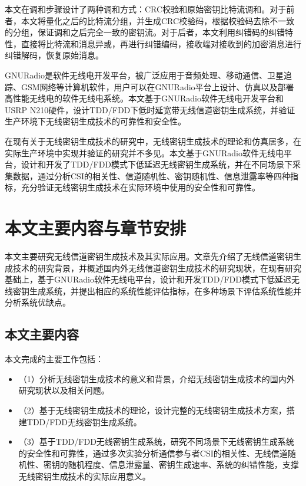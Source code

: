 \documentclass[master]{seuthesis} %
\begin{document}
\begin{Main}
本文在调和步骤设计了两种调和方式：CRC校验和原始密钥比特流调和。对于前者，本文将量化之后的比特流分组，并生成CRC校验码，根据校验码去除不一致的分组，保证调和之后完全一致的密钥流。对于后者，本文利用纠错码的纠错特性，直接将比特流和消息异或，再进行纠错编码，接收端对接收到的加密消息进行纠错解码，恢复原始消息。

GNURadio是软件无线电开发平台，被广泛应用于音频处理、移动通信、卫星追踪、GSM网络等计算机软件\cite{Blossom2004GNU}，用户可以在GNURadio平台上设计、仿真以及部署高性能无线电的软件无线电系统。本文基于GNURadio软件无线电开发平台和USRP N210硬件，设计TDD/FDD下低时延宽带无线信道密钥生成系统，并验证生产环境下无线密钥生成技术的可靠性和安全性。

在现有关于无线密钥生成技术的研究中，无线密钥生成技术的理论和仿真居多，在实际生产环境中实现并验证的研究并不多见。本文基于GNURadio软件无线电平台，设计和开发了TDD/FDD模式下低延迟无线密钥生成系统，并在不同场景下采集数据，通过分析CSI的相关性、信道随机性、密钥随机性、信息泄露率等四种指标，充分验证无线密钥生成技术在实际环境中使用的安全性和可靠性。

\section{本文主要内容与章节安排}

本文主要研究无线信道密钥生成技术及其实际应用。文章先介绍了无线信道密钥生成技术的研究背景，并概述国内外无线信道密钥生成技术的研究现状，在现有研究基础上，基于GNURadio软件无线电平台，设计和开发TDD/FDD模式下低延迟无线密钥生成系统，并提出相应的系统性能评估指标，在多种场景下评估系统性能并分析系统优缺点。

\subsection{本文主要内容}

本文完成的主要工作包括：

\begin{itemize}
    \item（1）分析无线密钥生成技术的意义和背景，介绍无线密钥生成技术的国内外研究现状以及相关问题。
    \item（2）基于无线密钥生成技术的理论，设计完整的无线密钥生成技术方案，搭建TDD/FDD无线密钥生成系统。
    \item（3）基于TDD/FDD无线密钥生成系统，研究不同场景下无线密钥生成系统的安全性和可靠性，通过多次实验分析通信参与者CSI的相关性、无线信道随机性、密钥的随机程度、信息泄露量、密钥生成速率、系统的纠错性能，支撑无线密钥生成技术的实际应用意义。
\end{itemize}


\end{Main}
\end{document}
